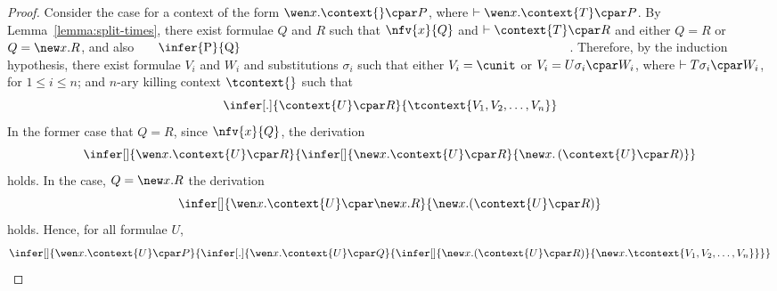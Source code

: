 \documentclass[UKenglish,acmsmall,authorversion]{acmart}
\theoremstyle{plain}
\begin{document}
\begin{proof}
Consider the case for a context of the form $\wen x. \context{} \cpar P$, where $\vdash \wen x. \context{ T } \cpar P$. %
By Lemma~\ref{lemma:split-times},
there exist formulae $Q$ and $R$ such that $\nfv{x}{Q}$ and $\vdash \context{T} \cpar R$ and either $Q = R$ or $Q = \new x. R$, and also
$
\vcenter{\infer{P}{Q}}
$.
Therefore, by the induction hypothesis,
there exist formulae $V_i$ and $W_i$ and substitutions $\sigma_i$ such that either $V_i = \cunit$ or $V_i = U \sigma_i \cpar W_i$, where $\vdash T \sigma_i \cpar W_i$, for $1 \leq i \leq n$;
and $n$-ary killing context $\tcontext{}$
such that 
\[
\infer[.]{
\context{ U } \cpar R
}{
\tcontext{ V_1, V_2, \hdots, V_n }
}
\]
%
In the former case that $Q = R$, since $\nfv{x}{Q}$, the derivation
\[
\infer[]{
\wen x. \context{ U } \cpar R
}{
\infer[]{
\new x. \context{ U } \cpar R
}{
\new x. \left( \context{ U } \cpar R \right)
}}
\] holds.
In the case, $Q = \new x. R$ the derivation 
\[
\infer[]{
\wen x .\context{ U } \cpar \new x. R
}{
\mathopen{\new x.} \left( \context{ U } \cpar R \right)
}
\] holds.
Hence, for all formulae $U$,
\[
\infer[]{
\wen x. \context{ U } \cpar P
}{
\infer[.]{
\wen x. \context{ U } \cpar Q
}{
\infer[]{
\mathopen{\new x.} \left( \context{ U } \cpar R \right)
}{
\new x. \tcontext{ V_1, V_2, \hdots, V_n}
}}}
\]

\end{proof}
\end{document}
